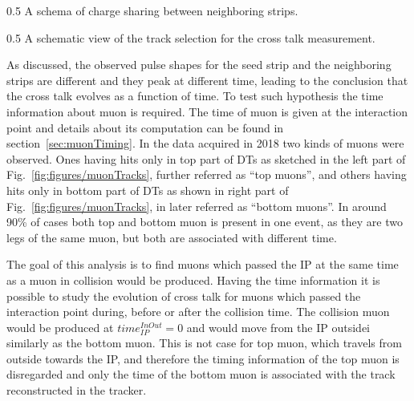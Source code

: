                  {0.5}       %
                 { A schema of charge sharing between neighboring strips. }

                 {0.5}       %
                 { A schematic view of the track selection for the cross talk measurement. }


As discussed, the observed pulse shapes for the seed strip and the neighboring strips are different and they peak at different time, leading to the conclusion that the cross talk evolves as a function of time. To test such hypothesis the time information about muon is required. The time of muon is given at the interaction point and details about its computation can be found in section~\ref{sec:muonTiming}. In the data acquired in 2018 two kinds of muons were observed. Ones having hits only in top part of DTs as sketched in the left part of Fig.~\ref{fig:figures/muonTracks}, further referred as ``top muons'',  and others having hits only in bottom part of DTs as shown in right part of Fig.~\ref{fig:figures/muonTracks}, in later referred as ``bottom muons''. In around 90\% of cases both top and bottom muon is present in one event, as they are two legs of the same muon, but both are associated with different time. 

The goal of this analysis is to find muons which passed the IP at the same time as a muon in collision would be produced. Having the time information it is possible to study the evolution of cross talk for muons which passed the interaction point during, before or after the collision time. The collision muon would be produced at $time_{IP}^{InOut}=0$ and would move from the IP outsidei similarly as the bottom muon. This is not case for top muon, which travels from outside towards the IP, and therefore the timing information of the top muon is disregarded and only the time of the bottom muon is associated with the track reconstructed in the tracker. 

